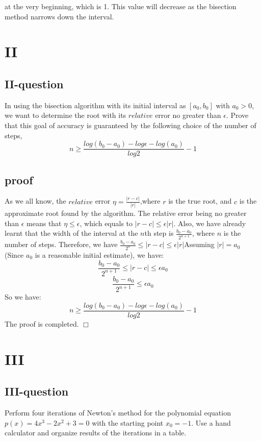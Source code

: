 \documentclass[a4paper]{article}
\begin{document}
at the very beginning, which is 1. This value will decrease as the bisection method narrows down the interval.


\section*{II}
\subsection*{II-question}
In using the bisection algorithm with its initial interval as $[a_0, b_0]$ with $a_0 > 0$, we want to determine the root
with its $relative$ error no greater than $\epsilon $. Prove that this goal of accuracy is guaranteed by the following choice 
of the number of steps,$$n \geq \frac{log(b_0-a_0)-log\epsilon -log(a_0)}{log2} -1$$

\subsection*{proof}

As we all know, the $relative$ error $\eta = \frac{|r - c|}{|r|} $,where $r$ is the true root, and $c$ is the approximate root found by the algorithm. 
The relative error being no greater than $\epsilon$ means that $\eta \leq \epsilon$, which equals to $|r - c| \leq \epsilon |r|$.
Also, we have already learnt that the width of the interval at the $n$th step is  $ \frac{b_0 - a_0}{2^{n+1}}$, where $n$ is the number of steps.
Therefore, we have $\frac{b_0 - a_0}{2^n}\leq|r - c| \leq \epsilon |r|  $Assuming $|r|=a_0$ (Since $a_0$ is a reasonable initial estimate), we have:
$$\frac{b_0 - a_0}{2^{n+1}}\leq|r - c| \leq \epsilon a_0$$
$$\frac{b_0 - a_0}{2^{n+1}}\leq \epsilon a_0$$
So we have: 
$$n \geq \frac{log(b_0-a_0)-log\epsilon -log(a_0)}{log2} -1$$ 
The proof is completed.  $\Box$ 

\section*{III}
\subsection*{III-question}
Perform four iterations of Newton's method for the
polynomial equation $p(x) = 4x^{3}-2x^{2}+3 = 0$ with
the starting point $x_0 = −1$. Use a hand calculator and
organize results of the iterations in a table.
\end{document}
